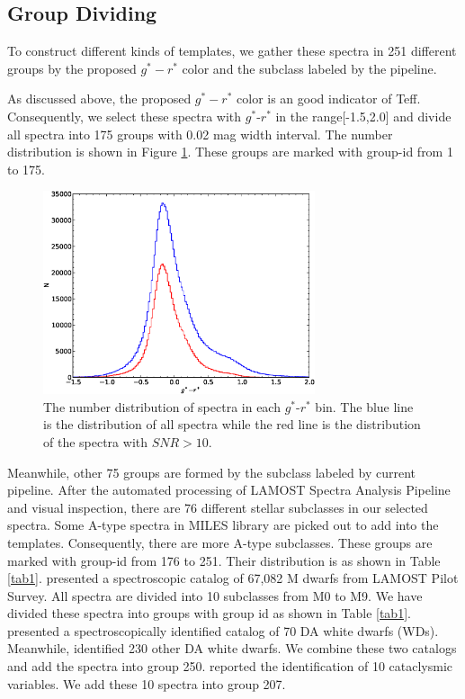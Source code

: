 \documentclass[referee]{raa}            %
\begin{document}
\subsection{Group Dividing}
To construct different kinds of templates, we gather these spectra in 251 different groups by the proposed $g^*-r^*$ color and the subclass labeled by the pipeline.

As discussed above, the proposed $g^*-r^*$ color is an good indicator of Teff.
Consequently, we select these spectra with $g^*$-$r^*$ in  the range[-1.5,2.0] and divide all spectra into 175 groups with 0.02 mag width interval.
The number distribution is shown in Figure \ref{Fig4}.
These groups are marked with group-id from 1 to 175.
 \begin{figure}
   \centering
   \includegraphics[width=8cm, angle=0,clip]{f2.eps}
   \caption{The number distribution of spectra in each $g^*$-$r^*$ bin.
   The blue line is the distribution of all spectra while the red line is the distribution of the spectra with $SNR>10$.
   }
   \label{Fig4}
   \end{figure}

Meanwhile, other 75 groups are formed by the subclass labeled by current pipeline.
After the automated processing of LAMOST Spectra Analysis Pipeline and visual inspection,
there are 76 different stellar subclasses in our selected spectra.
Some A-type spectra in MILES library\citep{falcon2011updated} are picked out to add into the templates.
Consequently, there are more A-type subclasses.
These groups are marked with group-id from 176 to 251.
Their distribution is as shown in Table \ref{tab1}.
 \citet{yi2013m} presented a spectroscopic catalog of 67,082 M dwarfs from LAMOST Pilot Survey.
All spectra are divided into 10 subclasses from M0 to M9.
We have divided these spectra into groups with group id as shown in Table \ref{tab1}.
 \citet{zhao201370}  presented a spectroscopically identified catalog of 70 DA white dwarfs  (WDs).
Meanwhile, \citet{zhang2013white}  identified 230 other DA  white dwarfs.
We combine these two catalogs and add the spectra into group 250.
 \citet{jiang2013data} reported the identification of 10 cataclysmic variables.
We add these 10 spectra into group 207.
%
\end{document}
